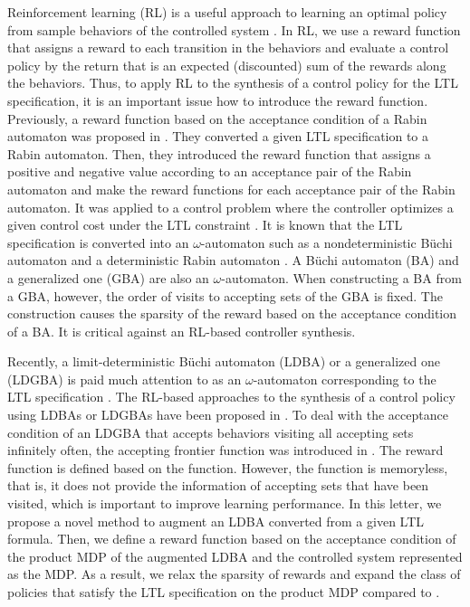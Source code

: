 \documentclass[letterpaper, 10 pt, conference]{ieeeconf}  %
\begin{document}
Reinforcement learning (RL) is a useful approach to learning an optimal policy from sample behaviors of the controlled system \cite{Sutton}.
In RL, we use a reward function that assigns a reward to each transition in the behaviors and evaluate a control policy by the return that is an expected (discounted) sum of the rewards along the behaviors.
Thus, to apply RL to the synthesis of a control policy for the LTL specification, it is an important issue how to introduce the reward function.
Previously, a reward function based on the acceptance condition of a Rabin automaton was proposed in \cite{Sadigh2014}. They converted a given LTL specification to a Rabin automaton. Then, they introduced the reward function that assigns a positive and negative value according to an acceptance pair of the Rabin automaton and make the reward functions for each acceptance pair of the Rabin automaton. It was applied to a control problem where the controller optimizes a given control cost under the LTL constraint \cite{HU2015}. It is known that the LTL specification is converted into an $\omega$-automaton such as a nondeterministic B\"{u}chi automaton and a deterministic Rabin automaton \cite{BK2008,Belta2017}. A B\"{u}chi automaton (BA) and a generalized one (GBA) are also an $\omega$-automaton. When constructing a BA from a GBA, however, the order of visits to accepting sets of the GBA is fixed. The construction causes the sparsity of the reward based on the acceptance condition of a BA. It is critical against an RL-based controller synthesis.

Recently, a limit-deterministic B\"{u}chi automaton (LDBA) or a generalized one (LDGBA) is paid much attention to as an $\omega$-automaton corresponding to the LTL specification \cite{SEJK2016}.
The RL-based approaches to the synthesis of a control policy using LDBAs or LDGBAs have been proposed in \cite{HAK2019,Hahn2019,HKAKPL2019,BWZP2019}.
To deal with the acceptance condition of an LDGBA that accepts behaviors visiting all accepting sets infinitely often, the accepting frontier function was introduced in \cite{HAK2019,HKAKPL2019}. The reward function is defined based on the function.
However, the function is memoryless, that is, it does not provide the information of accepting sets that have been visited, which is important to improve learning performance.
In this letter, we propose a novel method to augment an LDBA converted from a given LTL formula.
Then, we define a reward function based on the acceptance condition of the product MDP of the augmented LDBA and the controlled system represented as the MDP.
As a result, we relax the sparsity of rewards and expand the class of policies that satisfy the LTL specification on the product MDP compared to \cite{HAK2019}.
\end{document}
